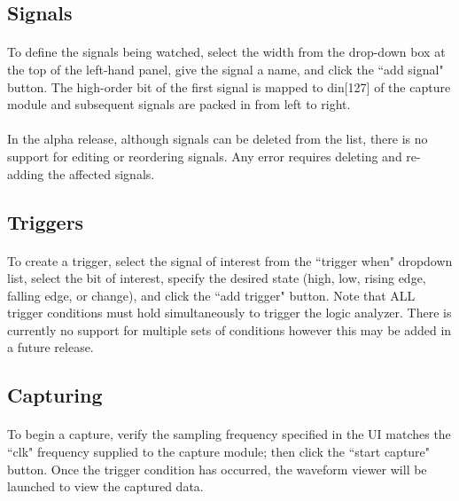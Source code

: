 \documentclass[pdftex]{article}
\begin{document}
\subsection{Signals}
\paragraph*{}
To define the signals being watched, select the width from the drop-down box at the top of the left-hand panel,
give the signal a name, and click the ``add signal" button. The high-order bit of the first signal is mapped to
din[127] of the capture module and subsequent signals are packed in from left to right.

\paragraph*{}
In the alpha release, although signals can be deleted from the list, there is no support for editing or reordering
signals. Any error requires deleting and re-adding the affected signals.

\subsection{Triggers}
\paragraph*{}
To create a trigger, select the signal of interest from the ``trigger when" dropdown list, select the bit of interest,
specify the desired state (high, low, rising edge, falling edge, or change), and click the ``add trigger" button. Note
that ALL trigger conditions must hold simultaneously to trigger the logic analyzer. There is currently no support for
multiple sets of conditions however this may be added in a future release.

\subsection{Capturing}
\paragraph*{}
To begin a capture, verify the sampling frequency specified in the UI matches the ``clk" frequency supplied to the
capture module; then click the ``start capture" button. Once the trigger condition has occurred, the waveform viewer
will be launched to view the captured data.
\end{document}
